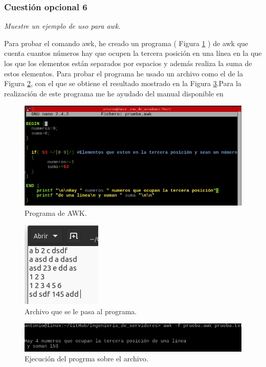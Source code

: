 \subsubsection{Cuestión opcional 6}
\textit{Muestre un ejemplo de uso para awk.}
\newline

Para probar el comando awk, he creado un programa ( Figura \ref{fig36} ) de awk que cuenta cuantos números hay que ocupen la tercera posición en una línea en la que los que los elementos están separados por espacios y además realiza la suma de estos elementos. Para probar el programa he usado un archivo como el de la Figura \ref{fig37}, con el que se obtiene el resultado mostrado en la Figura \ref{fig38}.Para la realización de este programa me he ayudado del manual disponible en \cite{awk}


\begin{figure}[H]
    \begin{center}
    \advance\leftskip-2.2cm
        \includegraphics[scale=0.75]{imagenes/img39}
        \caption{Programa de AWK.}
        \label{fig36}
    \end{center}
\end{figure}
\begin{figure}[H]
    \begin{center}
        \includegraphics[scale=0.8]{imagenes/img40}
        \caption{Archivo que se le pasa al programa.}
        \label{fig37}
    \end{center}
\end{figure}
\begin{figure}[H]
    \begin{center}
    \advance\leftskip-1cm
        \includegraphics[scale=0.7]{imagenes/img41}
        \caption{Ejecución del progrma sobre el archivo.}
        \label{fig38}
    \end{center}
\end{figure}




